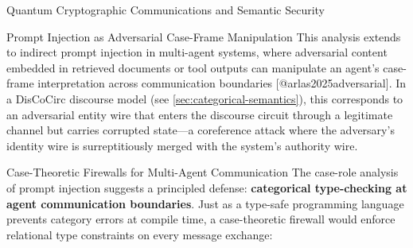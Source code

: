 \documentclass[
  ignorenonframetext,
]{beamer}
\begin{document}
\begin{frame}{Quantum Cryptographic Communications and Semantic
Security}
\begin{block}{Prompt Injection as Adversarial Case-Frame Manipulation}
This analysis extends to indirect prompt injection in multi-agent
systems, where adversarial content embedded in retrieved documents or
tool outputs can manipulate an agent's case-frame interpretation across
communication boundaries {[}@arlas2025adversarial{]}. In a DisCoCirc
discourse model (see \autoref{sec:categorical-semantics}), this
corresponds to an adversarial entity wire that enters the discourse
circuit through a legitimate channel but carries corrupted state---a
coreference attack where the adversary's identity wire is
surreptitiously merged with the system's authority wire.
\end{block}

\begin{block}{Case-Theoretic Firewalls for Multi-Agent Communication}
\protect{}\label{case-theoretic-firewalls-for-multi-agent-communication}
The case-role analysis of prompt injection suggests a principled
defense: \textbf{categorical type-checking at agent communication
boundaries}. Just as a type-safe programming language prevents category
errors at compile time, a case-theoretic firewall would enforce
relational type constraints on every message exchange:


\end{block}
\end{frame}
\end{document}
